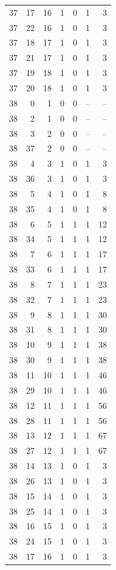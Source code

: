 \begin{longtable}{rrrrrrr}
37 & 17 & 16 & 1 & 0 & 1 & 3\\
37 & 22 & 16 & 1 & 0 & 1 & 3\\
37 & 18 & 17 & 1 & 0 & 1 & 3\\
37 & 21 & 17 & 1 & 0 & 1 & 3\\
37 & 19 & 18 & 1 & 0 & 1 & 3\\
37 & 20 & 18 & 1 & 0 & 1 & 3\\
38 & 0 & 1 & 0 & 0 & -- & --\\
38 & 2 & 1 & 0 & 0 & -- & --\\
38 & 3 & 2 & 0 & 0 & -- & --\\
38 & 37 & 2 & 0 & 0 & -- & --\\
38 & 4 & 3 & 1 & 0 & 1 & 3\\
38 & 36 & 3 & 1 & 0 & 1 & 3\\
38 & 5 & 4 & 1 & 0 & 1 & 8\\
38 & 35 & 4 & 1 & 0 & 1 & 8\\
38 & 6 & 5 & 1 & 1 & 1 & 12\\
38 & 34 & 5 & 1 & 1 & 1 & 12\\
38 & 7 & 6 & 1 & 1 & 1 & 17\\
38 & 33 & 6 & 1 & 1 & 1 & 17\\
38 & 8 & 7 & 1 & 1 & 1 & 23\\
38 & 32 & 7 & 1 & 1 & 1 & 23\\
38 & 9 & 8 & 1 & 1 & 1 & 30\\
38 & 31 & 8 & 1 & 1 & 1 & 30\\
38 & 10 & 9 & 1 & 1 & 1 & 38\\
38 & 30 & 9 & 1 & 1 & 1 & 38\\
38 & 11 & 10 & 1 & 1 & 1 & 46\\
38 & 29 & 10 & 1 & 1 & 1 & 46\\
38 & 12 & 11 & 1 & 1 & 1 & 56\\
38 & 28 & 11 & 1 & 1 & 1 & 56\\
38 & 13 & 12 & 1 & 1 & 1 & 67\\
38 & 27 & 12 & 1 & 1 & 1 & 67\\
38 & 14 & 13 & 1 & 0 & 1 & 3\\
38 & 26 & 13 & 1 & 0 & 1 & 3\\
38 & 15 & 14 & 1 & 0 & 1 & 3\\
38 & 25 & 14 & 1 & 0 & 1 & 3\\
38 & 16 & 15 & 1 & 0 & 1 & 3\\
38 & 24 & 15 & 1 & 0 & 1 & 3\\
38 & 17 & 16 & 1 & 0 & 1 & 3\\

\end{longtable}
